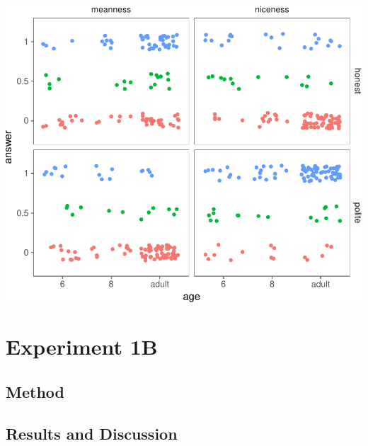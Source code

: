 \documentclass[a4paper,man,apacite,floatsintext]{apa6}
\newenvironment{CodeChunk}{}{}
\begin{document}
\begin{CodeChunk}

\includegraphics{figs/unnamed-chunk-4-1} \end{CodeChunk}

\section{Experiment 1B}\label{experiment-1b}

\subsection{Method}\label{method-1}

\subsection{Results and Discussion}\label{results-and-discussion-1}
\end{document}
